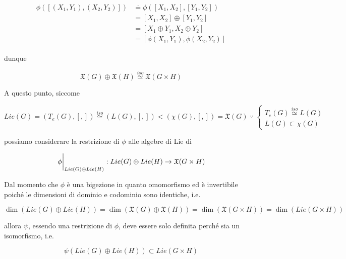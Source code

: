 \begin{align}
	\begin{split}
		\phi \left( [(X_{1},Y_{1}),(X_{2},Y_{2})] \right) &\doteq \phi \left( [X_{1},X_{2}], [Y_{1},Y_{2}] \right) \\
		&= [X_{1},X_{2}] \oplus [Y_{1},Y_{2}] \\
		&= [X_{1} \oplus Y_{1}, X_{2} \oplus Y_{2}] \\
		&= \left[ \phi(X_{1}, Y_{1}), \phi(X_{2}, Y_{2}) \right]
	\end{split}
\end{align}

dunque

\begin{equation}
	\mathfrak{X}(G) \oplus \mathfrak{X}(H) \stackrel{iso}{\simeq} \mathfrak{X}(G \times H)
\end{equation}

A questo punto, siccome

\begin{equation}
	Lie(G) = (T_{e}(G),[,]) \stackrel{iso}{\simeq} (L(G),[,]) < (\chi(G),[,]) = \mathfrak{X}(G) %
	\; \because \; %
	\begin{cases}
		T_{e}(G) \stackrel{iso}{\simeq} L(G) \\
		L(G) \subset \chi(G)
	\end{cases}
\end{equation}

possiamo considerare la restrizione di $ \phi $ alle algebre di Lie di

\begin{equation}
	\eval{\phi}_{Lie(G) \oplus Lie(H)} : Lie(G) \oplus Lie(H) \to \mathfrak{X}(G \times H)
\end{equation}

Dal momento che $ \phi $ è una bigezione in quanto omomorfismo ed è invertibile poiché le dimensioni di dominio e codominio sono identiche, i.e.

\begin{equation}
	\dim(Lie(G) \oplus Lie(H)) = \dim(\mathfrak{X}(G) \oplus \mathfrak{X}(H)) %
	= \dim(\mathfrak{X}(G \times H)) %
	= \dim(Lie(G \times H))
\end{equation}

allora $ \psi $, essendo una restrizione di $ \phi $, deve essere solo definita perché sia un isomorfismo, i.e.

\begin{equation}
	\psi(Lie(G) \oplus Lie(H)) \subset Lie(G \times H)
\end{equation}

